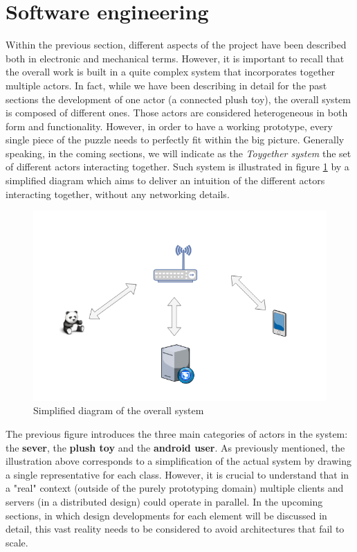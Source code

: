 \newpage
\section{Software engineering}
\label{sec:sw}

Within the previous section, different aspects of the project have been described both in electronic and mechanical terms. However, it is important to recall that the overall work is built in a quite complex system that incorporates together multiple actors. In fact, while we have been describing in detail for the past sections the development of one actor (a connected plush toy), the overall system is composed of different ones. Those actors are considered heterogeneous in both form and functionality. However, in order to have a working prototype, every single piece of the puzzle needs to perfectly fit within the big picture. Generally speaking, in the coming sections, we will indicate as the \textit{Toygether system} the set of different actors interacting together. Such system is illustrated in figure \ref{fig:SE_network_diagram} by a simplified diagram which aims to deliver an intuition of the different actors interacting together, without any networking details.

\begin{figure}[ht]
    \centering
    \includegraphics[scale=0.5]{images/SE_network_diagram.png}
    \caption{Simplified diagram of the overall system}
    \label{fig:SE_network_diagram}
\end{figure}

The previous figure introduces the three main categories of actors in the system: the \textbf{sever}, the \textbf{plush toy} and the \textbf{android user}. As previously mentioned, the illustration above corresponds to a simplification of the actual system by drawing a single representative for each class. However, it is crucial to understand that in a "real" context (outside of the purely prototyping domain) multiple clients and servers (in a distributed design) could operate in parallel. In the upcoming sections, in which design developments for each element will be discussed in detail, this vast reality needs to be considered to avoid architectures that fail to scale.

